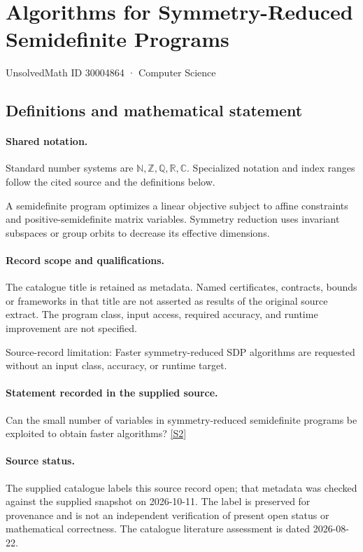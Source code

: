 \documentclass[11pt]{article}
\newcommand{\sref}[2]{\hyperlink{source:#1:#2}{[S#2]}}
\begin{document}
\setcounter{section}{30004863}
\section{Algorithms for Symmetry-Reduced Semidefinite Programs}\label{30004864}
{\small\sffamily UnsolvedMath ID 30004864 · Computer Science}
\subsection{Definitions and mathematical statement}

\paragraph{Shared notation.}Standard number systems are $\mathbb N,\mathbb Z,\mathbb Q,\mathbb R,\mathbb C$. Specialized notation and index ranges follow the cited source and the definitions below.


A semidefinite program optimizes a linear objective subject to affine constraints and positive-semidefinite matrix variables. Symmetry reduction uses invariant subspaces or group orbits to decrease its effective dimensions.
\paragraph{Record scope and qualifications.}
The catalogue title is retained as metadata. Named certificates, contracts, bounds or frameworks in that title are not asserted as results of the original source extract.
The program class, input access, required accuracy, and runtime improvement are not specified.

Source-record limitation: Faster symmetry-reduced SDP algorithms are requested without an input class, accuracy, or runtime target.
\paragraph{Statement recorded in the supplied source.}
Can the small number of variables in symmetry-reduced semidefinite programs be exploited to obtain faster algorithms? \sref{30004864}{2}
\paragraph{Source status.}
The supplied catalogue labels this source record open; that metadata was checked against the supplied snapshot on 2026-10-11. The label is preserved for provenance and is not an independent verification of present open status or mathematical correctness. The catalogue literature assessment is dated 2026-08-22.
\end{document}

